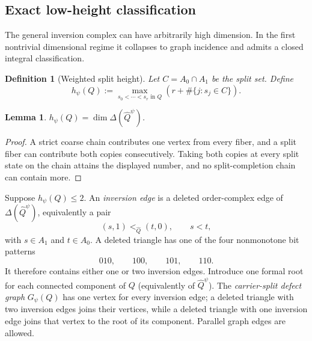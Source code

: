 \documentclass[11pt]{article}
\newtheorem{lemma}[theorem]{Lemma}
\newtheorem{definition}[theorem]{Definition}
\begin{document}
\subsection{Exact low-height classification}

The general inversion complex can have arbitrarily high dimension.  In the first
nontrivial dimensional regime it collapses to graph incidence and admits a closed
integral classification.

\begin{definition}[Weighted split height]
Let $C=A_0\cap A_1$ be the split set.  Define
\[
 h_\psi(Q)
 :=\max_{s_0<\cdots<s_r\text{ in }Q}
 \left(r+\#\{j:s_j\in C\}\right).
\]
\end{definition}

\begin{lemma}\label{lem:split-height}
$h_\psi(Q)=\dim\Delta(\widehat Q^\psi)$.
\end{lemma}
\begin{proof}
A strict coarse chain contributes one vertex from every fiber, and a split fiber can
contribute both copies consecutively.  Taking both copies at every split state on the
chain attains the displayed number, and no split-completion chain can contain more.
\end{proof}

Suppose $h_\psi(Q)\leq2$.  An \emph{inversion edge} is a deleted order-complex edge
of $\Delta(\widehat Q^\psi)$, equivalently a pair
\[
 (s,1)<_{\widehat Q}(t,0),\qquad s<t,
\]
with $s\in A_1$ and $t\in A_0$.  A deleted triangle has one of the four nonmonotone
bit patterns
\[
 010,\qquad100,\qquad101,\qquad110.
\]
It therefore contains either one or two inversion edges.  Introduce one formal root
for each connected component of $Q$ (equivalently of $\widehat Q^\psi$).  The
\emph{carrier-split defect graph} $G_\psi(Q)$ has one vertex for every inversion edge;
a deleted triangle with two inversion edges joins their vertices, while a deleted
triangle with one inversion edge joins that vertex to the root of its component.
Parallel graph edges are allowed.
\end{document}
